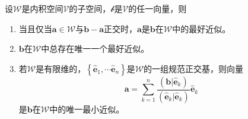 \documentclass[main.tex]{subfiles}
\begin{document}
\begin{theorem}[最好近似的表示]\label{thm:A.3}
    设$\mathcal{W}$是内积空间$\mathcal{V}$的子空间，$\mathcal{b}$是$\mathcal{V}$的任一向量，则
    \begin{enumerate}
        \item 当且仅当$\mathbf{a}\in\mathcal{W}$与$\mathbf{b}-\mathbf{a}$正交时，$\mathbf{a}$是$\mathbf{b}$在$\mathcal{W}$中的最好近似。
        \item $\mathbf{b}$在$\mathcal{W}$中总存在唯一一个最好近似。
        \item 若$\mathcal{W}$是有限维的，$\left\{\mathbf{\hat{e}}_1,\cdots\mathbf{\hat{e}}_n\right\}$是$\mathcal{W}$的一组规范正交基，则向量
              \[\mathbf{a}=\sum_{k=1}^n\frac{\left(\mathbf{b}|\mathbf{\hat{e}}_k\right)}{\left(\mathbf{\hat{e}}_k|\mathbf{\hat{e}}_k\right)}\mathbf{\hat{e}}_k\]
              是$\mathbf{b}$在$\mathcal{W}$中的唯一最小近似。
    \end{enumerate}
\end{theorem}
\end{document}
